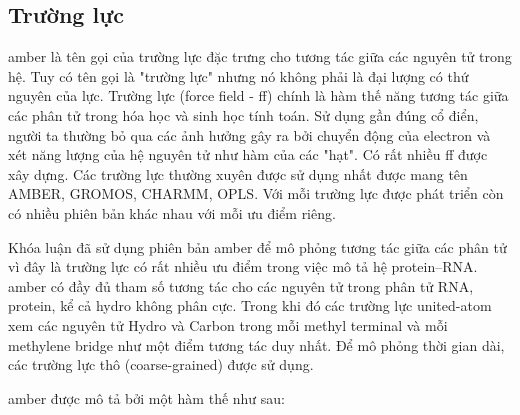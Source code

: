 \documentclass[12pt,a4paper,reqno, oneside]{book}
\begin{document}
	\subsection{Trường lực}
	\label{amberff}
		\Gls{amber} là tên gọi của trường lực đặc trưng cho tương tác giữa các nguyên tử trong hệ. Tuy có tên gọi là "trường lực" nhưng nó không phải là đại lượng có thứ nguyên của lực. Trường lực (force field - ff) chính là hàm thế năng tương tác giữa các phân tử trong hóa học và sinh học tính toán. Sử dụng gần đúng cổ điển, người ta thường bỏ qua các ảnh hưởng gây ra bởi chuyển động của electron và xét năng lượng của hệ nguyên tử như hàm của các "hạt". Có rất nhiều ff được xây dựng. Các trường lực thường xuyên được sử dụng nhất được mang tên AMBER\cite{Duan2003,Cornell1995,Hornak2006,Ponder2003,Mackerell2004}, GROMOS\cite{Soares2005,Oostenbrink2004,Schmid2011,Schuler2001,Cornell1995}, CHARMM\cite{Mackerell2004,Cornell1995}, OPLS\cite{Mackerell2004,Cornell1995}. Với mỗi trường lực được phát triển còn có nhiều phiên bản khác nhau với mỗi ưu điểm riêng.
		
		Khóa luận đã sử dụng phiên bản \gls{amber} để mô phỏng tương tác giữa các phân tử vì đây là trường lực có rất nhiều ưu điểm trong việc mô tả hệ protein--RNA\cite{Hornak2006}. \Gls{amber} có đầy đủ tham số tương tác cho các nguyên tử trong phân tử RNA, protein, kể cả hydro không phân cực. Trong khi đó các trường lực united-atom xem các nguyên tử Hydro và Carbon trong mỗi methyl terminal và mỗi methylene bridge như một điểm tương tác duy nhất. Để mô phỏng thời gian dài, các trường lực thô (coarse-grained) được sử dụng.
		
		\Gls{amber} được mô tả bởi một hàm thế như sau:
\end{document}
